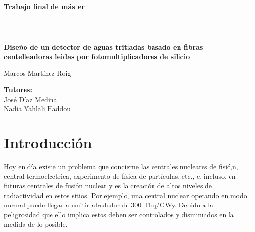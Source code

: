 \documentclass[11pt, a4paper]{article}
\begin{document}
\begin{titlepage}
\begin{center}
\begin{large}
\textbf{{\large Trabajo final de máster}}\\
\rule{80mm}{0.1mm}\\

\end{large}
\vspace*{0.2in}
\begin{Large}
\textbf{Diseño de un detector de aguas tritiadas basado en fibras centelleadoras leidas por fotomultiplicadores de silicio} \\
\end{Large}
\vspace*{2 cm}

\begin{large}
Marcos Martínez Roig\\
\end{large}
\end{center}

\vspace*{0.3in}
\vspace*{0.1in}
\begin{large}
\begin{flushright}
\item[\bf Tutores:\hspace{4cm} ]\quad  \\ José Díaz Medina\\
Nadia Yahlali Haddou\\
\end{flushright}
\end{large}

\end{titlepage}



\tableofcontents 
\newpage


\section {Introducción}
\paragraph {}
Hoy en día existe un problema que concierne  las  centrales nucleares de fisió,n, central termoeléctrica,  experimento de física de partículas, etc., e, incluso, en futuras centrales de fusión nuclear y es la creación de altos niveles de radiactividad en estos sitios. Por ejemplo, una central nuclear operando en modo normal puede llegar a emitir alrededor de 300 Tbq/GWy.  Debido a la peligrosidad que ello implica estos deben ser controlados y disminuidos en la medida de lo posible.
\end{document}
